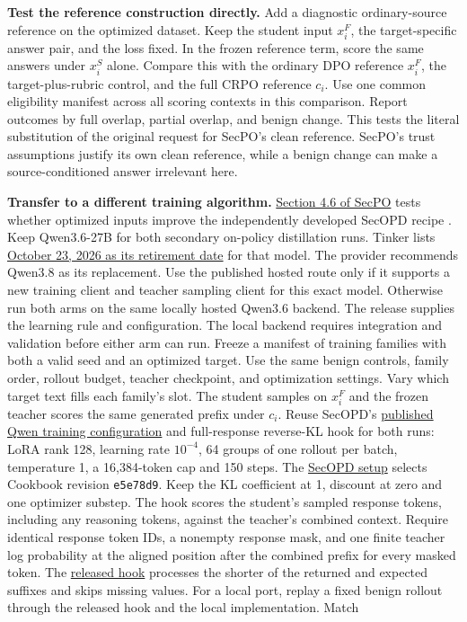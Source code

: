 \documentclass[11pt]{article}
\begin{document}
\textbf{Test the reference construction directly.} Add a diagnostic ordinary-source reference on the optimized dataset. Keep the student input $x_i^F$, the target-specific answer pair, and the loss fixed. In the frozen reference term, score the same answers under $x_i^S$ alone. Compare this with the ordinary DPO reference $x_i^F$, the target-plus-rubric control, and the full CRPO reference $c_i$. Use one common eligibility manifest across all scoring contexts in this comparison. Report outcomes by full overlap, partial overlap, and benign change. This tests the literal substitution of the original request for SecPO's clean reference. SecPO's trust assumptions justify its own clean reference, while a benign change can make a source-conditioned answer irrelevant here.

\textbf{Transfer to a different training algorithm.} \href{https://arxiv.org/html/2610.41998v1#S4.SS6}{Section 4.6 of SecPO} tests whether optimized inputs improve the independently developed SecOPD recipe \cite{chen2026secpo,peng2026secopd}. Keep Qwen3.6-27B for both secondary on-policy distillation runs. Tinker lists \href{https://tinker-docs.thinkingmachines.ai/tinker/model-deprecations/}{October 23, 2026 as its retirement date} for that model. The provider recommends Qwen3.8 as its replacement. Use the published hosted route only if it supports a new training client and teacher sampling client for this exact model. Otherwise run both arms on the same locally hosted Qwen3.6 backend. The release supplies the learning rule and configuration. The local backend requires integration and validation before either arm can run. Freeze a manifest of training families with both a valid seed and an optimized target. Use the same benign controls, family order, rollout budget, teacher checkpoint, and optimization settings. Vary which target text fills each family's slot. The student samples on $x_i^F$ and the frozen teacher scores the same generated prefix under $c_i$. Reuse SecOPD's \href{https://github.com/pppyb/SecOPD/blob/571502a2a315c4b8820dd878d4569e2a2222cb88/training/tinker/configs/qwen36_full_kl.paper.json}{published Qwen training configuration} and full-response reverse-KL hook for both runs: LoRA rank 128, learning rate $10^{-4}$, 64 groups of one rollout per batch, temperature 1, a 16,384-token cap and 150 steps. The \href{https://github.com/pppyb/SecOPD/blob/571502a2a315c4b8820dd878d4569e2a2222cb88/training/tinker/setup.sh}{SecOPD setup} selects Cookbook revision \texttt{e5e78d9}. Keep the KL coefficient at 1, discount at zero and one optimizer substep. The hook scores the student's sampled response tokens, including any reasoning tokens, against the teacher's combined context. Require identical response token IDs, a nonempty response mask, and one finite teacher log probability at the aligned position after the combined prefix for every masked token. The \href{https://github.com/pppyb/SecOPD/blob/571502a2a315c4b8820dd878d4569e2a2222cb88/training/tinker/overrides/tinker_cookbook/recipes/distillation/pi_defense_full_response_kl.py}{released hook} processes the shorter of the returned and expected suffixes and skips missing values. For a local port, replay a fixed benign rollout through the released hook and the local implementation. Match 
\end{document}
